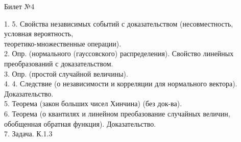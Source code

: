 \documentclass[preview]{standalone}
\begin{document}
 
\begin{center} {\Large Билет №4} \end{center} 

1. 5. Свойства независимых событий с доказательством (несовместность, условная вероятность, \\ теоретико-множественные операции).\\

2.  Опр. (нормального (гауссовского) распределения). Свойство линейных преобразований с доказательством.\\

3.  Опр. (простой случайной величины).\\

4. 4. Следствие (о независимости и корреляции для нормального вектора). Доказательство. \\

5.  Теорема (закон больших чисел Хинчина) (без док-ва).\\

6.  Теорема (о квантилях и линейном преобазование случайных величин, обобщенная обратная функция). Доказательство.\\

7. Задача. К.1.3\\
\end{document}
